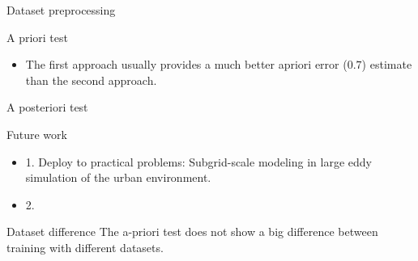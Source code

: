 \documentclass[paper slide]{beamer}
\begin{document}
\begin{frame}{Dataset preprocessing}

\end{frame}



\begin{frame}{A priori test}
	\begin{itemize}
		\item The first approach usually provides a much better apriori error ($0.7$) estimate than the second approach.
	\end{itemize}
\end{frame}

\begin{frame}{A posteriori test}

\end{frame}

\begin{frame}{Future work}
	\begin{itemize}
		\item 1. Deploy to practical problems: Subgrid-scale modeling in large eddy simulation of the
		urban environment.
		\item 2. 
	\end{itemize}
\end{frame}

\begin{frame}{Dataset difference}
	The a-priori test does not show a big difference between training with different datasets.
\end{frame}
\end{document}

